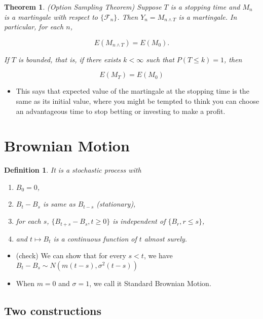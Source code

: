 \documentclass[11pt,reqno]{amsart}
\newtheorem{theorem}{Theorem}
\newtheorem{definition}{Definition}
\theoremstyle{remark}
\begin{document}
\begin{theorem}(Option Sampling Theorem)
Suppose \( T \) is a stopping time and \( M_n \) is a martingale with respect to \( \{\mathcal{F}_n\} \). Then \( Y_n = M_{n \land T} \) is a martingale. In particular, for each \( n \),

\[
E(M_{n \land T}) = E(M_0).
\]

If \( T \) is bounded, that is, if there exists \( k < \infty \) such that \( P(T \leq k) = 1 \), then

\[
E(M_T) = E(M_0)
\]
\end{theorem}

\begin{itemize}
\item This says that expected value of the martingale at the stopping time is the same as its initial value, where you might be tempted to think you can choose an advantageous time to stop betting or investing to make a profit.
\end{itemize}

\section{Brownian Motion}
\begin{definition}
It is a stochastic process with
\begin{enumerate}
\item \( B_0 = 0 \),
\item \( B_t - B_s \) is same as \( B_{t-s} \) (stationary),
\item for each \( s \), \( \{B_{t+s} - B_s, t \geq 0\} \) is independent of \( \{B_r, r \leq s\} \),
\item and \( t \mapsto B_t \) is a continuous function of \( t \) almost surely.
\end{enumerate}
\end{definition}
\begin{itemize}
\item (check) We can show that for every \( s < t \), we have \( B_t - B_s \sim N(m(t - s), \sigma^2(t - s)) \)
\item When \( m = 0 \) and \( \sigma = 1 \), we call it Standard Brownian Motion.
\end{itemize}
\subsection{Two constructions}
\end{document}
